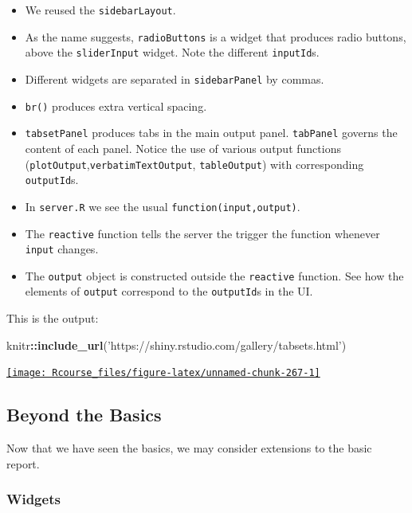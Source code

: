 \documentclass[]{book}
\newenvironment{Shaded}{\begin{snugshade}}{\end{snugshade}}
\newcommand{\KeywordTok}[1]{\textcolor[rgb]{0.13,0.29,0.53}{\textbf{#1}}}
\newcommand{\StringTok}[1]{\textcolor[rgb]{0.31,0.60,0.02}{#1}}
\newcommand{\OperatorTok}[1]{\textcolor[rgb]{0.81,0.36,0.00}{\textbf{#1}}}
\newcommand{\NormalTok}[1]{#1}
\providecommand{\tightlist}{%
  \setlength{\itemsep}{0pt}\setlength{\parskip}{0pt}}
\theoremstyle{definition}
\theoremstyle{definition}
\theoremstyle{definition}
\theoremstyle{remark}
\begin{document}
\begin{itemize}
\tightlist
\item
  We reused the \texttt{sidebarLayout}.
\item
  As the name suggests, \texttt{radioButtons} is a widget that produces
  radio buttons, above the \texttt{sliderInput} widget. Note the
  different \texttt{inputId}s.
\item
  Different widgets are separated in \texttt{sidebarPanel} by commas.
\item
  \texttt{br()} produces extra vertical spacing.
\item
  \texttt{tabsetPanel} produces tabs in the main output panel.
  \texttt{tabPanel} governs the content of each panel. Notice the use of
  various output functions
  (\texttt{plotOutput},\texttt{verbatimTextOutput},
  \texttt{tableOutput}) with corresponding \texttt{outputId}s.
\item
  In \texttt{server.R} we see the usual \texttt{function(input,output)}.
\item
  The \texttt{reactive} function tells the server the trigger the
  function whenever \texttt{input} changes.
\item
  The \texttt{output} object is constructed outside the
  \texttt{reactive} function. See how the elements of \texttt{output}
  correspond to the \texttt{outputId}s in the UI.
\end{itemize}

This is the output:

\begin{Shaded}
\begin{Highlighting}[]
\NormalTok{knitr}\OperatorTok{::}\KeywordTok{include_url}\NormalTok{(}\StringTok{'https://shiny.rstudio.com/gallery/tabsets.html'}\NormalTok{)}
\end{Highlighting}
\end{Shaded}

\href{https://shiny.rstudio.com/gallery/tabsets.html}{\texttt{[image: Rcourse\_files/figure-latex/unnamed-chunk-267-1]} }

\subsection{Beyond the Basics}\label{beyond-the-basics}

Now that we have seen the basics, we may consider extensions to the
basic report.

\subsubsection{Widgets}\label{widgets}
\end{document}
